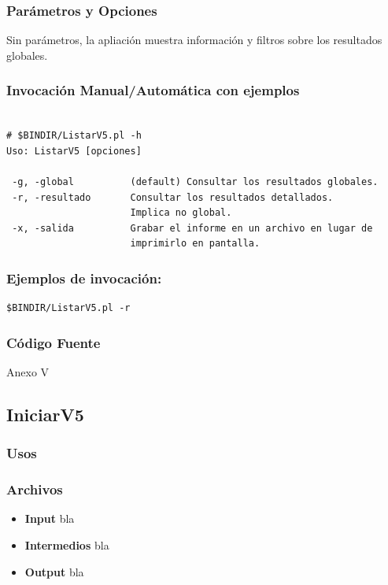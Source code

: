\documentclass[a4paper,10pt,titlepage]{article}
\begin{document}
		\subsubsection{Par\'ametros y Opciones}
		
Sin parámetros, la apliación muestra información y filtros sobre los resultados globales.
	
		\subsubsection{Invocaci\'on Manual/Autom\'atica con ejemplos}

\begin{verbatim}

# $BINDIR/ListarV5.pl -h
Uso: ListarV5 [opciones]

 -g, -global          (default) Consultar los resultados globales.
 -r, -resultado       Consultar los resultados detallados.
                      Implica no global.
 -x, -salida          Grabar el informe en un archivo en lugar de
                      imprimirlo en pantalla.
\end{verbatim}

		\subsubsection{Ejemplos de invocación:}

\begin{verbatim}
$BINDIR/ListarV5.pl -r 
\end{verbatim}

		\subsubsection{C\'odigo Fuente}
			Anexo V

	\subsection{IniciarV5}
		\subsubsection{Usos}


		\subsubsection{Archivos}
			\begin {itemize}
				\item \textbf{Input} {bla}
				\item \textbf{Intermedios} {bla}
				\item \textbf{Output} {bla}
			\end{itemize}
\end{document}
